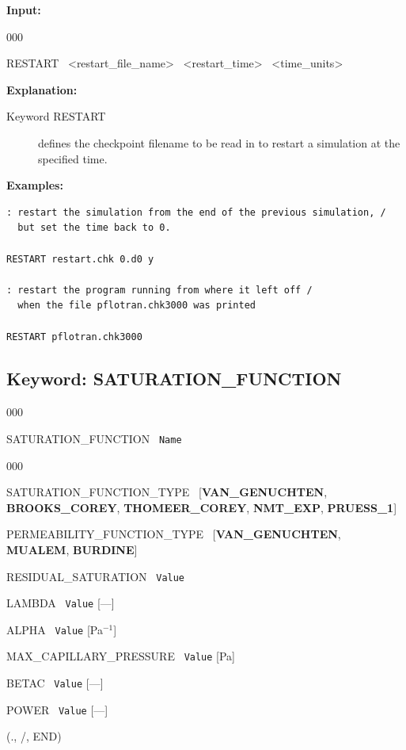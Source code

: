 \documentclass[12pt]{article}
\begin{document}
{\noindent\bf Input:}

\begin{deflist}{000}
\item[RESTART] \ <restart\_file\_name> \ <restart\_time> \ <time\_units>
\end{deflist}

{\noindent\bf Explanation:}
\begin{description}
\item[Keyword RESTART] defines the checkpoint filename to be read in to restart a simulation at the specified time.
\end{description}

{\noindent\bf
Examples:}

\begin{verbatim}
: restart the simulation from the end of the previous simulation, /
  but set the time back to 0.

RESTART restart.chk 0.d0 y

: restart the program running from where it left off /
  when the file pflotran.chk3000 was printed

RESTART pflotran.chk3000

\end{verbatim}


\newpage
\protect\hypertarget{target_sat}{}

\subsection{Keyword: SATURATION\_FUNCTION}


\begin{deflist}{000}
\item[SATURATION\_FUNCTION] \ {\tt Name}

\begin{deflist}{000}
\item[SATURATION\_FUNCTION\_TYPE] \ [{\bf VAN\_GENUCHTEN}, {\bf BROOKS\_COREY}, {\bf THOMEER\_COREY}, {\bf NMT\_EXP}, {\bf PRUESS\_1}]
\item[PERMEABILITY\_FUNCTION\_TYPE] \ [{\bf VAN\_GENUCHTEN}, {\bf MUALEM}, {\bf BURDINE}]
\item[RESIDUAL\_SATURATION] \ {\tt Value}
\item[LAMBDA] \ {\tt Value} [---]
\item[ALPHA] \ {\tt Value} [Pa$^{-1}$]
\item[MAX\_CAPILLARY\_PRESSURE] \ {\tt Value} [Pa]
\item[BETAC] \ {\tt Value} [---]
\item[POWER] \ {\tt Value} [---]
\end{deflist}
\item[(., /, END)]
\end{deflist}
\end{document}
